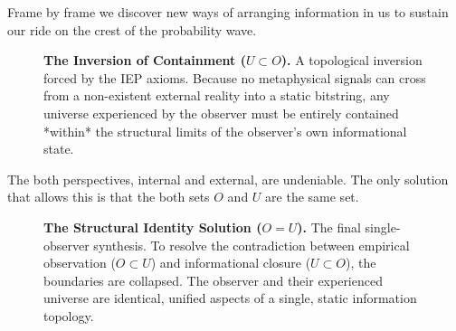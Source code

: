 Frame by frame we discover new ways of arranging information in us to sustain
our ride on the crest of the probability wave.

\begin{figure}[htbp]
\centering
{}
\caption{\textbf{The Inversion of Containment ($U \subset O$).} A topological inversion forced by the IEP axioms. Because no metaphysical signals can cross from a non-existent external reality into a static bitstring, any universe experienced by the observer must be entirely contained *within* the structural limits of the observer's own informational state.}
\label{fig:diag2}
\end{figure}

\newpage

The both perspectives, internal and external, are undeniable. The
only solution that allows this is that the both sets $O$ and $U$
are the same set. 


\begin{figure}[htbp]
\centering
{}
\caption{\textbf{The Structural Identity Solution ($O = U$).} The final single-observer synthesis. To resolve the contradiction between empirical observation ($O \subset U$) and informational closure ($U \subset O$), the boundaries are collapsed. The observer and their experienced universe are identical, unified aspects of a single, static information topology.}
\label{fig:diag3}
\end{figure}

